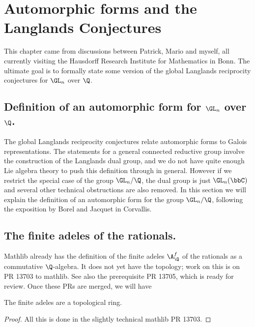 \chapter{Automorphic forms and the Langlands Conjectures}

This chapter came from discussions between Patrick, Mario and myself, all currently
visiting the Hausdorff Research Institute for
Mathematics in Bonn. The ultimate goal is to formally state some version of the global Langlands
reciprocity conjectures for $\GL_n$ over $\Q$.

\section[Definition of an automorphic form]{Definition of an automorphic form for $\GL_n$ over $\Q$.}

The global Langlands reciprocity conjectures relate automorphic forms to Galois representations.
The statements for a general connected reductive group involve the construction of the Langlands
dual group, and we do not have quite enough Lie algebra theory to push this definition through
in general. However if we restrict the special case of the group $\GL_n/\Q$, the dual group
is just $\GL_n(\bbC)$ and several other technical obstructions are also removed. In this
section we will explain the definition of an automorphic form for the group $\GL_n/\Q$, following
the exposition by Borel and Jacquet in Corvallis.

\section{The finite adeles of the rationals.}

Mathlib already has the definition of the finite adeles $\A_{\Q}^f$ of the rationals as a
commutative $\Q$-algebra. It does not yet have the topology; work on this is on PR 13703 to mathlib.
See also the prerequisite PR 13705, which is ready for review. Once these PRs are merged, we will
have

\begin{corollary}
  \label{DedekindDomain.instTopologicalRingFiniteAdeleRing}
  \leanok
  The finite adeles are a topological ring.
\end{corollary}
\begin{proof} All this is done in the slightly technical mathlib PR 13703.
  \leanok
\end{proof}

